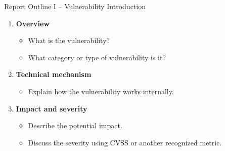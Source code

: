 \begin{frame}[t]{Report Outline I -- Vulnerability Introduction}
\begin{enumerate}
  \setlength{\itemsep}{0.18cm}
  \item \textbf{Overview}
    \begin{itemize}
      \item What is the vulnerability?
      \item What category or type of vulnerability is it?
    \end{itemize}
  \item \textbf{Technical mechanism}
    \begin{itemize}
      \item Explain how the vulnerability works internally.
    \end{itemize}
  \item \textbf{Impact and severity}
    \begin{itemize}
      \item Describe the potential impact.
      \item Discuss the severity using CVSS or another recognized metric.
    \end{itemize}
\end{enumerate}
\end{frame}
